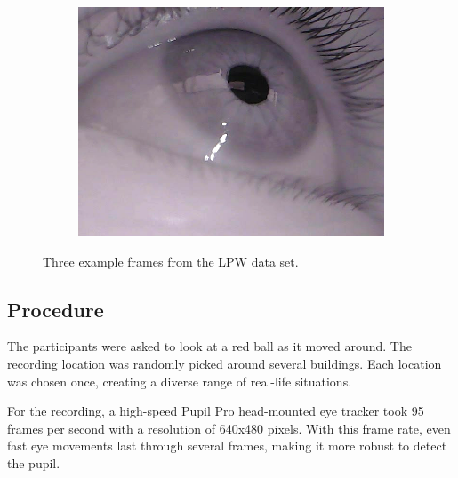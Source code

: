 \begin{figure}[ht]
\begin{subfigure}{.30\textwidth}
      \label{fig:ds2}
    \end{subfigure}%
    \begin{subfigure}{.30\textwidth}
      \centering
      \includegraphics[width=.9\linewidth]{plots/eye_dataset/eye3.png}

      \label{fig:ds3}
    \end{subfigure}
    \caption{Three example frames from the LPW data set.}
    \label{fig:example_frame}
    \end{figure}

    \subsection{Procedure}
    The participants were asked to look at a red ball as it moved around. The recording location was randomly picked around several buildings. Each location was chosen once, creating a diverse range of real-life situations. 

    For the recording, a high-speed Pupil Pro head-mounted eye tracker took 95 frames per second with a resolution of 640x480 pixels. With this frame rate, even fast eye movements last through several frames, making it more robust to detect the pupil. 


